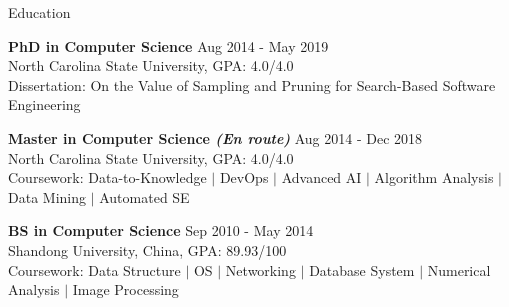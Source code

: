 \documentclass{resume} %
\begin{document}

\vspace{2em}

\begin{rSection}{Education}

{\bf PhD in Computer Science} \hfill {Aug 2014 - May 2019}\\ 
North Carolina State University, GPA: 4.0/4.0  \\
Dissertation: On the Value of Sampling and Pruning for Search-Based Software Engineering

{\bf Master in Computer Science {\it (En route)}} \hfill {Aug 2014 - Dec 2018}\\ 
North Carolina State University, GPA: 4.0/4.0  \\
Coursework: Data-to-Knowledge $|$ DevOps $|$ Advanced AI $|$ Algorithm Analysis $|$ Data Mining $|$ Automated SE

{\bf BS in Computer Science} \hfill {Sep 2010 - May 2014}\\ 
Shandong University, China, GPA: 89.93/100  \\
Coursework: Data Structure $|$ OS $|$ Networking $|$ Database System $|$ Numerical Analysis $|$ Image Processing

\end{rSection} 

\end{document}
